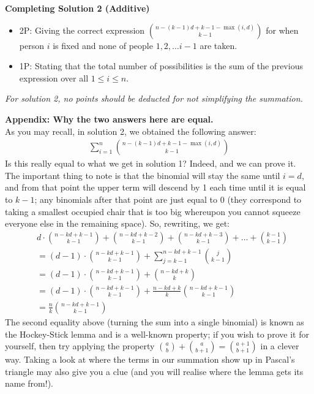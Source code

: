 { \textbf{Completing Solution 2 (Additive)}
\begin{itemize}
     \item 2P: Giving the correct expression $\binom{n-(k-1)d+k-1-\max(i,d)}{k-1}$ for when person $i$ is fixed and none of people $1, 2, \dots i-1$ are taken.
     \item 1P: Stating that the total number of possibilities is the sum of the previous expression over all $1 \le i \le n$.
 \end{itemize}
 \emph{For solution 2, no points should be deducted for not simplifying the summation.}
\bigskip 

\textbf{Appendix: Why the two answers here are equal.}\\
As you may recall, in solution 2, we obtained the following answer:
\begin{align*}
    \sum_{i=1}^{n} \binom{n-(k-1)d+k-1-\max(i,d)}{k-1} 
\end{align*}
Is this really equal to what we get in solution 1? Indeed, and we can prove it.\\ The important thing to note is that the binomial will stay the same until $i = d$, and from that point the upper term will descend by 1 each time until it is equal to $k-1$; any binomials after that point are just equal to 0 (they correspond to taking a smallest occupied chair that is too big whereupon you cannot squeeze everyone else in the remaining space). So, rewriting, we get:
\begin{align*}
    &d \cdot \binom{n-kd+k-1}{k-1} + \binom{n-kd+k-2}{k-1} + \binom{n-kd+k-3}{k-1} + \dots + \binom{k-1}{k-1}\\
    &= (d-1) \cdot \binom{n-kd+k-1}{k-1} + \sum_{j = k-1}^{n-kd+k-1} \binom{j}{k-1}\\
    &= (d-1) \cdot \binom{n-kd+k-1}{k-1} + \binom{n-kd+k}{k}\\
    &= (d-1) \cdot \binom{n-kd+k-1}{k-1} + \frac{n-kd+k}{k}\binom{n-kd+k-1}{k-1}\\
    &= \frac{n}{k} \binom{n-kd+k-1}{k-1}
\end{align*}
The second equality above (turning the sum into a single binomial) is known as the Hockey-Stick lemma and is a well-known property; if you wish to prove it for yourself, then try applying the property $\binom{a}{b} + \binom{a}{b+1} = \binom{a+1}{b+1}$ in a clever way. Taking a look at where the terms in our summation show up in Pascal's triangle may also give you a clue (and you will realise where the lemma gets its name from!). 
}


